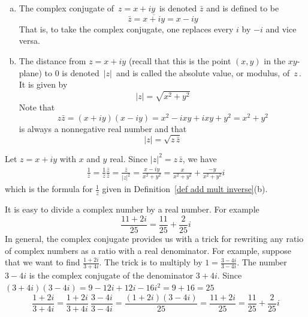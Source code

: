\begin{defn}\label{def conjugate}
\begin{enumerate}[(a)]
\item
The complex conjugate of $\, z=x+iy\, $ is denoted $\bar z$ and is
defined to be 
\begin{equation*}
\bar z=\overline{x+iy}=x-i y
\end{equation*} 
That is, to take the complex conjugate, one
replaces every $i$ by $-i$ and vice versa.
\item
The distance from $z=x+iy$ (recall that this is the point $(x,y)$ in the 
$xy$-plane) to $0$ is  denoted $\, |z|\, $ and is called the
absolute value, or modulus,  of $\, z\, $.  It is given by
\begin{equation*}
|z| = \sqrt{x^2+y^2}
\end{equation*}
Note that 
\begin{equation*}
z\bar z=(x+iy)(x-iy)=x^2-ixy+ixy+y^2=x^2+y^2
\end{equation*}
is always a nonnegative real number and that
\begin{equation*}
|z| = \sqrt{z\,\bar z}
\end{equation*}
\end{enumerate}
\end{defn}
\begin{remark}\label{rem inverse}
Let $z=x+iy$ with $x$ and $y$ real. Since $|z|^2=z\,\bar z$, we have
\begin{align*}
\frac{1}{z} =\frac{1}{z}\frac{\bar z}{\bar z} = \frac{\bar z}{|z|^2} =\frac{x-iy}{x^2+y^2}
=\frac{x}{x^2+y^2}+\frac{-y}{x^2+y^2}i
\end{align*}
which is the formula for $\frac{1}{z}$ given in 
Definition~\ref{def add mult inverse}(b).
\end{remark}
\begin{eg}\label{eg:division}
It is easy to divide a complex number by a real number. For example
\begin{equation*}
\frac{11+2i}{25} = \frac{11}{25}+\frac{2}{25}i
\end{equation*}
In general, the complex conjugate provides us with a trick for rewriting 
any ratio of complex numbers as a ratio with a real denominator. 
For example, suppose that we want to find $\frac{1+2i}{3+4i}$. The trick is 
to multiply by $1=\frac{3-4i}{3-4i}$. The number $3-4i$ is the complex conjugate of the denominator $3+4i$. Since $(3+4i)(3-4i)=9-12i+12i-16i^2=9+16=25$
\begin{equation*}
\frac{1+2i}{3+4i}=\frac{1+2i}{3+4i}\ \frac{3-4i}{3-4i}
=\frac{(1+2i)(3-4i)}{25}
=\frac{11+2i}{25}
= \frac{11}{25}+\frac{2}{25}i
\end{equation*}
\end{eg}
